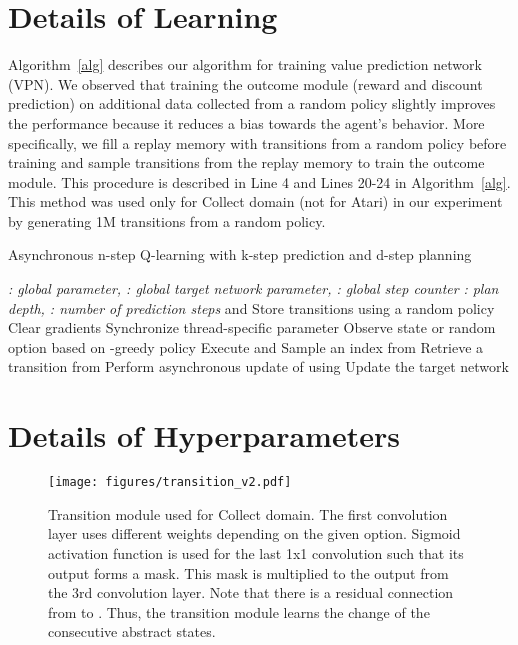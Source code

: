\documentclass{article}
\begin{document}
\clearpage
\section{Details of Learning}
Algorithm~\ref{alg} describes our algorithm for training value prediction network (VPN). We observed that training the outcome module (reward and discount prediction) on additional data collected from a random policy slightly improves the performance because it reduces a bias towards the agent's behavior. 
More specifically, we fill a replay memory with  transitions from a random policy before training and sample transitions from the replay memory to train the outcome module. This procedure is described in Line 4 and Lines 20-24 in Algorithm~\ref{alg}. This method was used only for Collect domain (not for Atari) in our experiment by generating 1M transitions from a random policy.
\begin{algorithm}[H]
\small
\caption{Asynchronous n-step Q-learning with k-step prediction and d-step planning}\label{alg}
\begin{algorithmic}[1]
\State \textit{: global parameter, : global target network parameter, : global step counter}
\State \textit{: plan depth, : number of prediction steps}
\State  and 
\State  Store  transitions  using a random policy
\State Clear gradients 
\State Synchronize thread-specific parameter 
\State 
\State  Observe state 
\State   or random option based on -greedy policy
\State  Execute 
\State  and 
\EndWhile
\State 
{}
\State 
\State 
\EndFor
\State  Sample an index from  
\State  Retrieve a transition from 
\State 
\EndFor
\State Perform asynchronous update of  using 
\State Update the target network 
\EndIf
\EndWhile
\end{algorithmic}
\end{algorithm}


\clearpage
\section{Details of Hyperparameters}
\begin{figure}[h]
\centering
\texttt{[image: figures/transition\_v2.pdf]}
\caption{Transition module used for Collect domain. The first convolution layer uses different weights depending on the given option. Sigmoid activation function is used for the last 1x1 convolution such that its output forms a mask. This mask is multiplied to the output from the 3rd convolution layer. Note that there is a residual connection from  to . Thus, the transition module learns the change of the consecutive abstract states. }
\label{fig:transition}
\end{figure}
\end{document}
